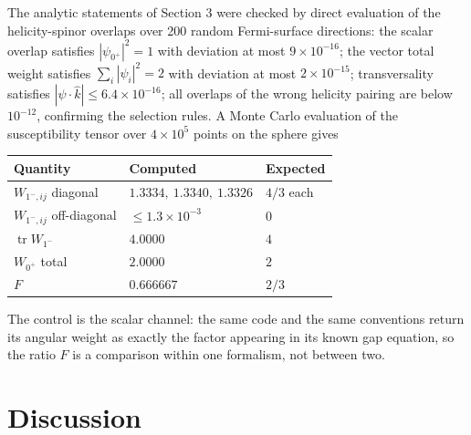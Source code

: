 \documentclass[11pt]{article}
\begin{document}
The analytic statements of Section 3 were checked by direct evaluation of the helicity-spinor overlaps over 200 random Fermi-surface directions: the scalar overlap satisfies $|\psi_{0^+}|^2 = 1$ with deviation at most $9 \times 10^{-16}$; the vector total weight satisfies $\sum_i |\psi_i|^2 = 2$ with deviation at most $2 \times 10^{-15}$; transversality satisfies $|\psi \cdot \hat k| \le 6.4 \times 10^{-16}$; all overlaps of the wrong helicity pairing are below $10^{-12}$, confirming the selection rules. A Monte Carlo evaluation of the susceptibility tensor over $4 \times 10^5$ points on the sphere gives
\begin{center}
\begin{tabular}{@{}lll@{}}
\toprule
Quantity & Computed & Expected \\
\midrule
$W_{1^-,ij}$ diagonal & $1.3334,\ 1.3340,\ 1.3326$ & $4/3$ each \\
$W_{1^-,ij}$ off-diagonal & $\le 1.3 \times 10^{-3}$ & $0$ \\
$\operatorname{tr} W_{1^-}$ & $4.0000$ & $4$ \\
$W_{0^+}$ total & $2.0000$ & $2$ \\
$F$ & $0.666667$ & $2/3$ \\
\bottomrule
\end{tabular}
\end{center}
The control is the scalar channel: the same code and the same conventions return its angular weight as exactly the factor appearing in its known gap equation, so the ratio $F$ is a comparison within one formalism, not between two.

\section{Discussion}
\end{document}
